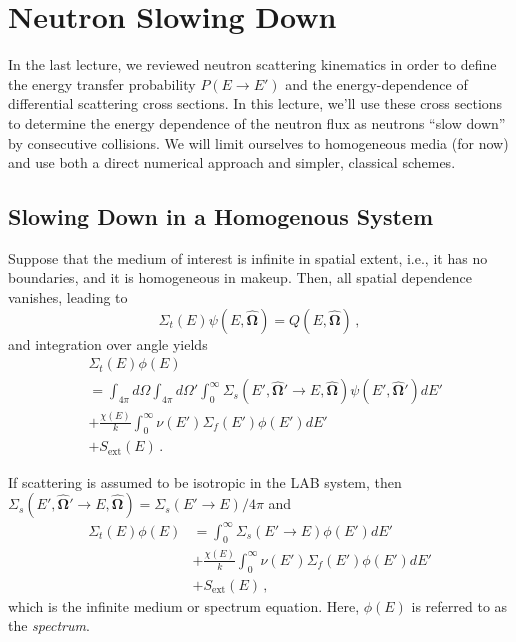 \chapter{Neutron Slowing Down}
\label{lec:neutron_slowing_down}

In the last lecture, we reviewed neutron scattering kinematics in order 
to define the energy transfer probability $P(E\to E')$ and the 
energy-dependence of differential scattering 
cross sections. In this 
lecture, we'll use these cross sections to determine the energy dependence 
of the neutron flux as neutrons ``slow down'' by consecutive collisions.
We will limit ourselves to homogeneous media (for now) and use 
both a direct numerical approach and simpler, classical schemes.


\section*{Slowing Down in a Homogenous System}

Suppose that the medium of interest is infinite in spatial extent, i.e.,
it has no boundaries, and it is homogeneous in makeup.  Then, all 
spatial dependence vanishes, leading to
\begin{equation}
       \Sigma_t(E) \psi (E, \bm{\hat{\Omega}})
            = Q(E, \bm{\hat{\Omega}}) \, ,
\end{equation}
and integration over angle yields
\begin{equation}
    \begin{split}
      & \Sigma_t(E)  \phi ( E) \\
        &= \int_{4\pi} d\Omega \int_{4\pi} d\Omega' \int^{\infty}_{0} \Sigma_s(E',\bm{\hat{\Omega}}' \to  E,\bm{\hat{\Omega}}) \psi(E', \bm{\hat{\Omega}'}) dE' \\
        &+ \frac{\chi(E)}{k} \int^{\infty}_{0} \nu(E')\Sigma_f(E') \phi(E') dE' \\
        &+ S_{\text{ext}}( E) \, .
    \end{split}
    \label{eq:infmedintegrated}
\end{equation}
    
If scattering is assumed to be isotropic in the LAB system, then 
$\Sigma_s(E',\bm{\hat{\Omega}}' \to  E,\bm{\hat{\Omega}}) = \Sigma_s(E'\to E)/4\pi$ and
\begin{equation}
\begin{split}
      \Sigma_t(E)  \phi (E) &= \int^{\infty}_{0} \Sigma_s( E' \to  E) \phi(E') dE' \\
        &+ \frac{\chi(E)}{k} \int^{\infty}_{0} \nu(E')\Sigma_f(E') \phi(E') dE' \\
        &+ S_{\text{ext}}(E) \, ,
\end{split}
\label{eq:infmedspectrum}
\end{equation}
which is the infinite medium or spectrum equation.  Here, $\phi (E)$ is 
referred to as the \emph{spectrum}.
    
